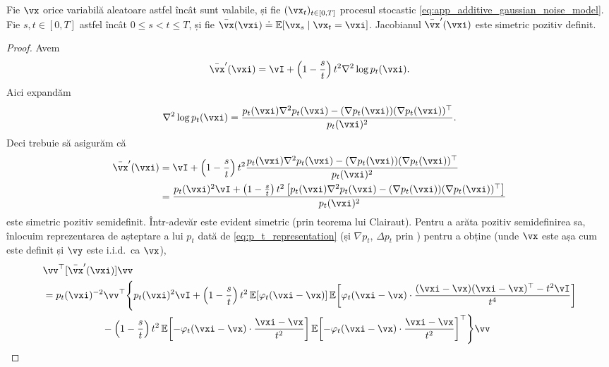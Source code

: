 \documentclass[../../book-main_ro.tex]{subfiles}
\begin{document}
\begin{lemma}\label{lem:gribonval_A1}
    Fie \(\vx\) orice variabilă aleatoare astfel încât  sunt valabile, și fie \((\vx_{t})_{t \in [0, T]}\) procesul stocastic \eqref{eq:app_additive_gaussian_noise_model}. Fie \(s, t \in [0, T]\) astfel încât \(0 \leq s < t \leq T\), și fie \(\bar{\vx}(\vxi) \doteq \Ex[\vx_{s} \mid \vx_{t} = \vxi]\). Jacobianul \(\bar{\vx}^{\prime}(\vxi)\) este simetric pozitiv definit.
\end{lemma}
\begin{proof}
    Avem 
    \begin{equation}
        \bar{\vx}^{\prime}(\vxi) = \vI + \bp{1 - \frac{s}{t}}t^{2}\nabla^{2}\log p_{t}(\vxi).
    \end{equation}
    Aici expandăm 
    \begin{equation}
        \nabla^{2}\log p_{t}(\vxi) = \frac{p_{t}(\vxi)\nabla^{2}p_{t}(\vxi) - (\nabla p_{t}(\vxi))(\nabla p_{t}(\vxi))^{\top}}{p_{t}(\vxi)^{2}}.
    \end{equation}
    Deci trebuie să asigurăm că 
    \begin{align}
        \bar{\vx}^{\prime}(\vxi)
        &= \vI + \bp{1 - \frac{s}{t}}t^{2}\frac{p_{t}(\vxi)\nabla^{2}p_{t}(\vxi) - (\nabla p_{t}(\vxi))(\nabla p_{t}(\vxi))^{\top}}{p_{t}(\vxi)^{2}} \\
        &= \frac{p_{t}(\vxi)^{2}\vI + \bp{1 - \frac{s}{t}}t^{2}\bs{p_{t}(\vxi)\nabla^{2}p_{t}(\vxi) - (\nabla p_{t}(\vxi))(\nabla p_{t}(\vxi))^{\top}}}{p_{t}(\vxi)^{2}}
    \end{align}
    este simetric pozitiv semidefinit. Într-adevăr este evident simetric (prin teorema lui Clairaut). Pentru a arăta pozitiv semidefinirea sa, înlocuim reprezentarea de așteptare a lui \(p_{t}\) dată de \eqref{eq:p_t_representation} (și \(\nabla p_{t}\), \(\Delta p_{t}\) prin ) pentru a obține (unde \(\vx\) este așa cum este definit și \(\vy\) este i.i.d.~ca \(\vx\)),
    \begin{align}
        &\vv^{\top}[\bar{\vx}^{\prime}(\vxi)]\vv \\
        &= p_{t}(\vxi)^{-2}\vv^{\top}\Bigg\{p_{t}(\vxi)^{2}\vI + \bp{1 - \frac{s}{t}}t^{2}\Ex[\phi_{t}(\vxi - \vx)]\Ex\rs{\phi_{t}(\vxi - \vx)\cdot\frac{(\vxi - \vx)(\vxi - \vx)^{\top} - t^{2}\vI}{t^{4}}} \\
        & \qquad \qquad \qquad -\bp{1 - \frac{s}{t}}t^{2}\Ex\rs{-\phi_{t}(\vxi - \vx)\cdot\frac{\vxi - \vx}{t^{2}}}\Ex\rs{-\phi_{t}(\vxi - \vx)\cdot\frac{\vxi - \vx}{t^{2}}}^{\top}\Bigg\}\vv \\

\end{align}
\end{proof}
\end{document}
